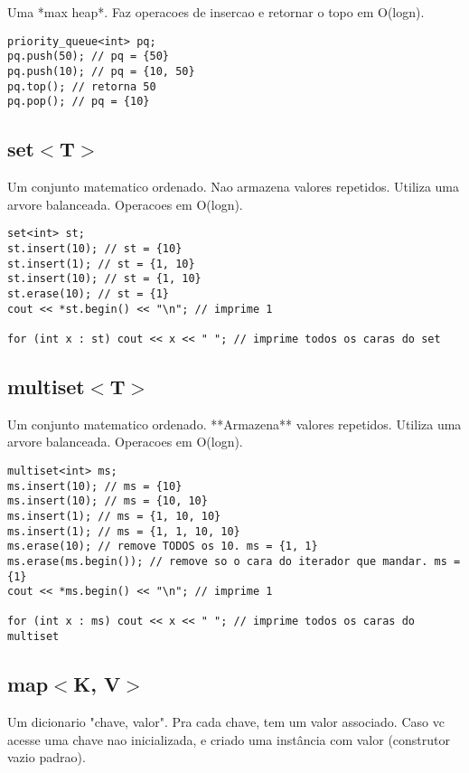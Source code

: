 Uma *max heap*. Faz operacoes de insercao e retornar o topo em O(logn).

\begin{lstlisting}
priority_queue<int> pq;
pq.push(50); // pq = {50}
pq.push(10); // pq = {10, 50}
pq.top(); // retorna 50
pq.pop(); // pq = {10}
\end{lstlisting}

\subsection{set$<$T$>$}

Um conjunto matematico ordenado. Nao armazena valores repetidos. Utiliza uma arvore balanceada. Operacoes em O(logn).

\begin{lstlisting}
set<int> st;
st.insert(10); // st = {10}
st.insert(1); // st = {1, 10}
st.insert(10); // st = {1, 10}
st.erase(10); // st = {1}
cout << *st.begin() << "\n"; // imprime 1

for (int x : st) cout << x << " "; // imprime todos os caras do set
\end{lstlisting}

\subsection{multiset$<$T$>$}

Um conjunto matematico ordenado. **Armazena** valores repetidos. Utiliza uma arvore balanceada. Operacoes em O(logn).

\begin{lstlisting}
multiset<int> ms;
ms.insert(10); // ms = {10}
ms.insert(10); // ms = {10, 10}
ms.insert(1); // ms = {1, 10, 10}
ms.insert(1); // ms = {1, 1, 10, 10}
ms.erase(10); // remove TODOS os 10. ms = {1, 1}
ms.erase(ms.begin()); // remove so o cara do iterador que mandar. ms = {1}
cout << *ms.begin() << "\n"; // imprime 1

for (int x : ms) cout << x << " "; // imprime todos os caras do multiset
\end{lstlisting}

\subsection{map$<$K, V$>$}

Um dicionario "chave, valor". Pra cada chave, tem um valor associado. Caso vc acesse uma chave nao inicializada, e criado uma instância com valor {} (construtor vazio padrao).

